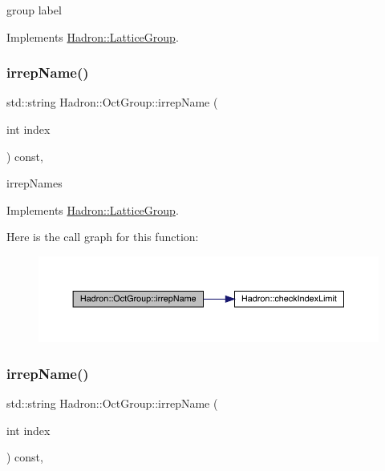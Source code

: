 group label 

Implements \mbox{\hyperlink{structHadron_1_1LatticeGroup_a82208a322bf1b1db489f16af38e70087}{Hadron\+::\+Lattice\+Group}}.

\mbox{\label{structHadron_1_1OctGroup_a58f84ff32d1dce2277f3b9da9d35d594}} 
\subsubsection{\texorpdfstring{irrepName()}{irrepName()}\hspace{0.1cm}{\footnotesize\ttfamily [1/3]}}
{\footnotesize\ttfamily std\+::string Hadron\+::\+Oct\+Group\+::irrep\+Name (\begin{DoxyParamCaption}\item[{int}]{index }\end{DoxyParamCaption}) const\hspace{0.3cm}{\ttfamily [inline]}, {\ttfamily [virtual]}}

irrep\+Names 

Implements \mbox{\hyperlink{structHadron_1_1LatticeGroup_a4bc5620218c2a73157e19bc4451fe746}{Hadron\+::\+Lattice\+Group}}.

Here is the call graph for this function\+:
\nopagebreak
\begin{figure}[H]
\begin{center}
\leavevmode
\includegraphics[width=350pt]{d1/de5/structHadron_1_1OctGroup_a58f84ff32d1dce2277f3b9da9d35d594_cgraph}
\end{center}
\end{figure}
\mbox{\label{structHadron_1_1OctGroup_a58f84ff32d1dce2277f3b9da9d35d594}} 
\subsubsection{\texorpdfstring{irrepName()}{irrepName()}\hspace{0.1cm}{\footnotesize\ttfamily [2/3]}}
{\footnotesize\ttfamily std\+::string Hadron\+::\+Oct\+Group\+::irrep\+Name (\begin{DoxyParamCaption}\item[{int}]{index }\end{DoxyParamCaption}) const\hspace{0.3cm}{\ttfamily [inline]}, {\ttfamily [virtual]}}


